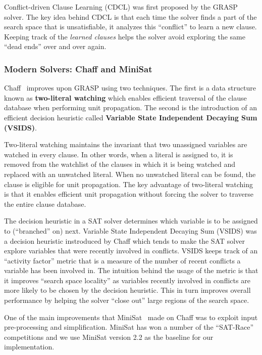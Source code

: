 \documentclass[letterpaper, compsoc, conference]{IEEEtran}
\begin{document}
Conflict-driven Clause Learning (CDCL) was first proposed by the
GRASP~\cite{Silva1997GRASP} solver. The key idea behind CDCL is that each time the
solver finds a part of the search space that is unsatisfiable, it analyzes this
``conflict'' to learn a new clause. Keeping track of the \emph{learned clauses}
helps the solver avoid exploring the same ``dead ends'' over and over again.

\subsubsection{Modern Solvers: Chaff and MiniSat}

Chaff~\cite{Moskewicz2001Chaff} improves upon GRASP using two techniques.  The
first is a data structure known as \textbf{two-literal watching} which enables
efficient traversal of the clause database when performing unit propagation.
The second is the introduction of an efficient decision heuristic called
\textbf{Variable State Independent Decaying Sum (VSIDS)}.

Two-literal watching maintains the invariant that two unassigned variables are
watched in every clause. In other words, when a literal is assigned to, it is
removed from the watchlist of the clauses in which it is being watched and
replaced with an unwatched literal. When no unwatched literal can be found, the
clause is eligible for unit propagation. The key advantage of two-literal
watching is that it enables efficient unit propagation without forcing the
solver to traverse the entire clause database.

The decision heuristic in a SAT solver determines which variable is to be
assigned to (``branched'' on) next.  Variable State Independent Decaying Sum
(VSIDS) was a decision heuristic instroduced by Chaff which tends to make the
SAT solver explore variables that were recently involved in conflicts. VSIDS
keeps track of an ``activity factor'' metric that is a measure of the number of
recent conflicts a variable has been involved in.  The intuition behind the
usage of the metric is that it improves ``search space locality'' as variables
recently involved in conflicts are more likely to be chosen by the decision
heuristic.  This in turn improves overall performance by helping the solver
``close out'' large regions of the search space.

One of the main improvements that MiniSat~\cite{MiniSat} made on Chaff was to
exploit input pre-processing and simplification. MiniSat has won a number of
the ``SAT-Race'' competitions and we use MiniSat version 2.2 as the baseline
for our implementation.
\end{document}
